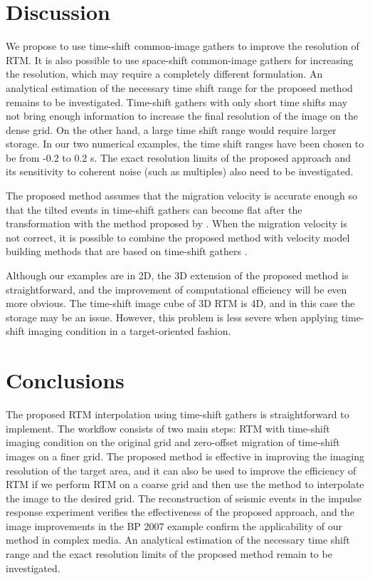 \section{Discussion}
We propose to use time-shift common-image gathers to improve the resolution of RTM.
It is also possible to use space-shift common-image gathers for increasing the resolution, which may require a completely different formulation.
An analytical estimation of the necessary time shift range for the proposed method remains to be investigated.
Time-shift gathers with only short time shifts may not bring enough information to increase the final resolution of the image on the dense grid.
On the other hand, a large time shift range would require larger storage.
In our two numerical examples, the time shift ranges have been chosen to be from -0.2 to 0.2 s.
The exact resolution limits of the proposed approach and its sensitivity to coherent noise (such as multiples) also need to be investigated.

The proposed method assumes that the migration velocity is accurate enough so that the tilted events in time-shift gathers can become flat after the transformation with the method proposed by \cite{xu14}.
When the migration velocity is not correct, it is possible to combine the proposed method with velocity model building methods that are based on time-shift gathers \cite[]{yang11, luo16}.

Although our examples are in 2D, the 3D extension of the proposed method is straightforward, and the improvement of computational efficiency will be even more obvious.
The time-shift image cube of 3D RTM is 4D, and in this case the storage may be an issue.
However, this problem is less severe when applying time-shift imaging condition in a target-oriented fashion.

\section{Conclusions}
The proposed RTM interpolation using time-shift gathers is straightforward to implement. 
The workflow consists of two main steps: RTM with time-shift imaging condition
on the original grid and zero-offset migration of time-shift images on a finer grid.
The proposed method is effective in improving the imaging resolution of the target area, and 
it can also be used to improve the efficiency of RTM if we perform RTM on a coarse grid and then use
the method to interpolate the image to the desired grid.
The reconstruction of seismic events in the impulse response experiment verifies the effectiveness of the proposed approach, and the image improvements in the BP 2007 example confirm the applicability of our method in complex media.
An analytical estimation of the necessary time shift range and the exact resolution limits of the proposed method remain to be investigated.

